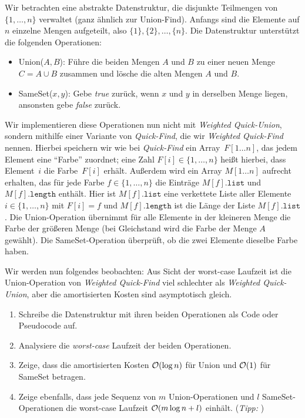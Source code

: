 \documentclass{uebung_cs}
\begin{document}
\begin{exercise}[Mengenvereinigungen]
    Wir betrachten eine abstrakte Datenstruktur, die disjunkte Teilmengen von $\{1,\dots,n\}$ verwaltet (ganz ähnlich zur Union-Find).
    Anfangs sind die Elemente auf $n$ einzelne Mengen aufgeteilt, also $\{1\}, \{2\}, \dots,\{n\}$.
    Die Datenstruktur unterstützt die folgenden Operationen:
    \begin{itemize}
        \item Union($A,B$): Führe die beiden Mengen $A$ und $B$ zu einer neuen Menge $C = A \cup B$ zusammen und lösche die alten Mengen $A$ und $B$.
        \item SameSet($x,y$): Gebe \textit{true} zurück, wenn $x$ und $y$ in derselben Menge liegen, ansonsten gebe \textit{false} zurück.
    \end{itemize}
    Wir implementieren diese Operationen nun nicht mit \emph{Weighted Quick-Union}, sondern mithilfe einer Variante von \emph{Quick-Find}, die wir \emph{Weighted Quick-Find} nennen.
    Hierbei speichern wir wie bei \emph{Quick-Find} ein Array~$F[1\dots n]$, das jedem Element eine \enquote{Farbe} zuordnet; eine Zahl $F[i]\in\{1,\dots,n\}$ heißt hierbei, dass Element~$i$ die Farbe~$F[i]$ erhält.
    Außerdem wird ein Array $M[1\dots n]$ aufrecht erhalten, das für jede Farbe $f\in\{1,\dots,n\}$ die Einträge $M[f].\mathtt{list}$ und  $M[f].\mathtt{length}$ enthält. Hier ist $M[f].\mathtt{list}$ eine verkettete Liste aller Elemente~$i\in\{1,\dots,n\}$ mit $F[i]=f$ und $M[f].\mathtt{length}$ ist die Länge der Liste $M[f].\mathtt{list}$.
    Die Union-Operation übernimmt für alle Elemente in der kleineren Menge die Farbe der größeren Menge (bei Gleichstand wird die Farbe der Menge $A$ gewählt). Die SameSet-Operation überprüft, ob die zwei Elemente dieselbe Farbe haben.

    Wir werden nun folgendes beobachten:
    Aus Sicht der worst-case Laufzeit ist die Union-Operation von \emph{Weighted Quick-Find} viel schlechter als \emph{Weighted Quick-Union}, aber die amortisierten Kosten sind asymptotisch gleich.
    \begin{enumerate}
        \item\athome Schreibe die Datenstruktur mit ihren beiden Operationen als Code oder Pseudocode auf.
        \item\athome Analysiere die \textit{worst-case} Laufzeit der beiden Operationen.
        \item\atschool\mittel Zeige, dass die amortisierten Kosten $\mathcal{O}(\log n)$ für Union und $\mathcal{O}(1)$ für SameSet betragen.
        \item\atschool\note Zeige ebenfalls, dass jede Sequenz von $m$ Union-Operationen und $l$ SameSet-Operationen die worst-case Laufzeit $\mathcal{O}(m \log n + l)$ einhält.
        (\emph{Tipp: })
    \end{enumerate}
\end{exercise}
\end{document}

